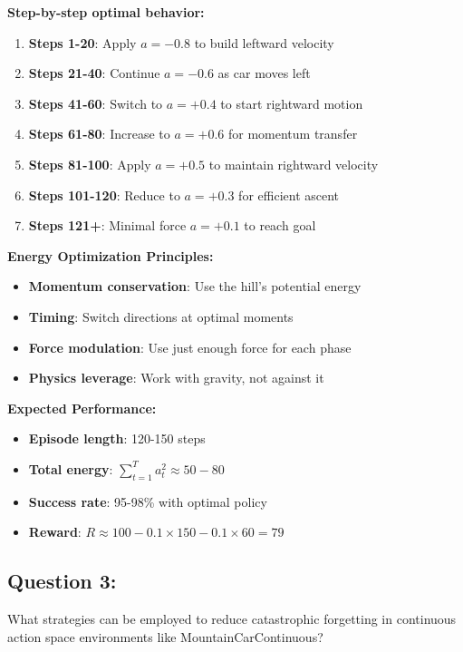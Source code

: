 \documentclass[12pt]{article}
\begin{document}
{{{\textbf{Step-by-step optimal behavior:}
\begin{enumerate}
    \item \textbf{Steps 1-20}: Apply $a = -0.8$ to build leftward velocity
    \item \textbf{Steps 21-40}: Continue $a = -0.6$ as car moves left
    \item \textbf{Steps 41-60}: Switch to $a = +0.4$ to start rightward motion
    \item \textbf{Steps 61-80}: Increase to $a = +0.6$ for momentum transfer
    \item \textbf{Steps 81-100}: Apply $a = +0.5$ to maintain rightward velocity
    \item \textbf{Steps 101-120}: Reduce to $a = +0.3$ for efficient ascent
    \item \textbf{Steps 121+}: Minimal force $a = +0.1$ to reach goal
\end{enumerate}

\textbf{Energy Optimization Principles:}
\begin{itemize}
    \item \textbf{Momentum conservation}: Use the hill's potential energy
    \item \textbf{Timing}: Switch directions at optimal moments
    \item \textbf{Force modulation}: Use just enough force for each phase
    \item \textbf{Physics leverage}: Work with gravity, not against it
\end{itemize}

\textbf{Expected Performance:}
\begin{itemize}
    \item \textbf{Episode length}: 120-150 steps
    \item \textbf{Total energy}: $\sum_{t=1}^{T} a_t^2 \approx 50-80$
    \item \textbf{Success rate}: 95-98\% with optimal policy
    \item \textbf{Reward}: $R \approx 100 - 0.1 \times 150 - 0.1 \times 60 = 79$
\end{itemize}

\subsection{Question 3:}

What strategies can be employed to reduce catastrophic forgetting in continuous action space environments like MountainCarContinuous?

}}}
\end{document}

